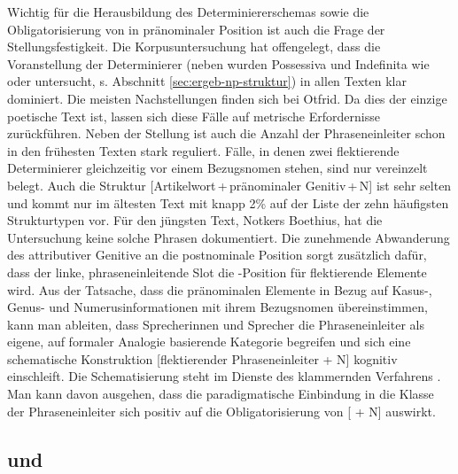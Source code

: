 Wichtig für die Herausbildung des Determiniererschemas sowie die Obligatorisierung von  in pränominaler Position ist auch die Frage der Stellungsfestigkeit. Die Korpusuntersuchung hat offengelegt, dass die Voranstellung der Determinierer (neben  wurden Possessiva und Indefinita wie  oder  untersucht, s. Abschnitt \ref{sec:ergeb-np-struktur}) in allen Texten klar dominiert. Die meisten Nachstellungen finden sich bei Otfrid. Da dies der einzige poetische Text ist, lassen sich diese Fälle auf metrische Erfordernisse zurückführen. Neben der Stellung ist auch die Anzahl der Phraseneinleiter schon in den frühesten Texten stark reguliert. Fälle, in denen zwei flektierende Determinierer gleichzeitig vor einem Bezugsnomen stehen, sind nur vereinzelt belegt. Auch die Struktur [Artikelwort\,+\,pränominaler Genitiv\,+\,N] ist sehr selten und kommt nur im ältesten Text mit knapp 2\% auf der Liste der zehn häufigsten Strukturtypen vor. Für den jüngsten Text, Notkers Boethius, hat die Untersuchung keine solche Phrasen dokumentiert. Die zunehmende Abwanderung des attributiver Genitive an die postnominale Position sorgt zusätzlich dafür, dass der linke, phraseneinleitende Slot die -Position für flektierende Elemente wird. Aus der Tatsache, dass die pränominalen Elemente in Bezug auf Kasus-, Genus- und Numerusinformationen mit ihrem Bezugsnomen übereinstimmen, kann man ableiten, dass Sprecherinnen und Sprecher die Phraseneinleiter als eigene, auf formaler Analogie basierende Kategorie begreifen und sich eine schematische Konstruktion [flektierender Phraseneinleiter + N] kognitiv einschleift. Die Schematisierung steht im Dienste des klammernden Verfahrens \parencite{Ronneberger-Sibold1994,Ronneberger-Sibold2010a,Szczepaniak2010,Szczepaniak2011a,Flick2018}. Man kann davon ausgehen, dass die paradigmatische Einbindung in die Klasse der Phraseneinleiter sich positiv auf die Obligatorisierung von [ + N] auswirkt.     


\subsection{ und } \label{sec:disk-weg-block}

